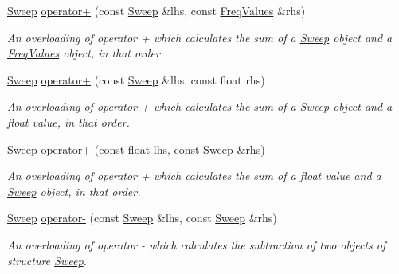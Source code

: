 \begin{DoxyCompactItemize}
\mbox{\label{structSweep_a5d6fad874c778ae77a10b57446a0bd93}} 
\hyperlink{structSweep}{Sweep} \hyperlink{structSweep_a5d6fad874c778ae77a10b57446a0bd93}{operator+} (const \hyperlink{structSweep}{Sweep} \&lhs, const \hyperlink{structFreqValues}{Freq\+Values} \&rhs)
\begin{DoxyCompactList}\small\item\em An overloading of operator + which calculates the sum of a {\itshape \hyperlink{structSweep}{Sweep}} object and a {\itshape \hyperlink{structFreqValues}{Freq\+Values}} object, in that order. \end{DoxyCompactList}\item 
\mbox{\label{structSweep_ae8dce428f848644d0a68cc8309f88ebf}} 
\hyperlink{structSweep}{Sweep} \hyperlink{structSweep_ae8dce428f848644d0a68cc8309f88ebf}{operator+} (const \hyperlink{structSweep}{Sweep} \&lhs, const float rhs)
\begin{DoxyCompactList}\small\item\em An overloading of operator + which calculates the sum of a {\itshape \hyperlink{structSweep}{Sweep}} object and a {\itshape float} value, in that order. \end{DoxyCompactList}\item 
\mbox{\label{structSweep_ac0d73d5e8e3aab8f87c9815588b66821}} 
\hyperlink{structSweep}{Sweep} \hyperlink{structSweep_ac0d73d5e8e3aab8f87c9815588b66821}{operator+} (const float lhs, const \hyperlink{structSweep}{Sweep} \&rhs)
\begin{DoxyCompactList}\small\item\em An overloading of operator + which calculates the sum of a {\itshape float} value and a {\itshape \hyperlink{structSweep}{Sweep}} object, in that order. \end{DoxyCompactList}\item 
\mbox{\label{structSweep_a8f704b31d015e4d81d25d3fceca1e2f1}} 
\hyperlink{structSweep}{Sweep} \hyperlink{structSweep_a8f704b31d015e4d81d25d3fceca1e2f1}{operator-\/} (const \hyperlink{structSweep}{Sweep} \&lhs, const \hyperlink{structSweep}{Sweep} \&rhs)
\begin{DoxyCompactList}\small\item\em An overloading of operator -\/ which calculates the subtraction of two objects of structure {\itshape \hyperlink{structSweep}{Sweep}}. \end{DoxyCompactList}\item 

\end{DoxyCompactItemize}
